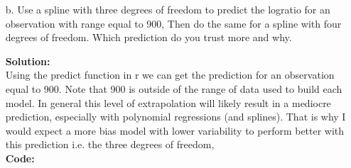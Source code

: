 \documentclass[12pt]{article}
\makeatletter
\theoremstyle{homework}
\newenvironment{exercise}[1]
{\def\@currentlabel{#1}\exercisecore}
{\endexercisecore}
\newcommand{\localhead}[1]{\par\smallskip\noindent\textbf{#1}\nobreak\\}%
\newcommand\solution{\localhead{Solution:}}
\makeatother
\begin{document}
\begin{exercise}{2}
\begin{enumerate}
    \item[b.] Use a spline with three degrees of freedom to predict the logratio for an observation with range equal to 900,
    Then do the same for a spline with four degrees of freedom. Which prediction do you trust more and why.\\
    \solution Using the predict function in r we can get the prediction for an observation equal to 900. Note that 900
    is outside of the range of data used to build each model. In general this level of extrapolation will likely result in 
    a mediocre prediction, especially with polynomial regressions (and splines). That is why I would expect a more bias model with 
    lower variability to perform better with this prediction i.e. the three degrees of freedom, \\
    \textbf{Code:}
    \begin{center}
    
    \end{center} 
  \end{enumerate}
 \end{exercise}
 \newpage
\end{document}
